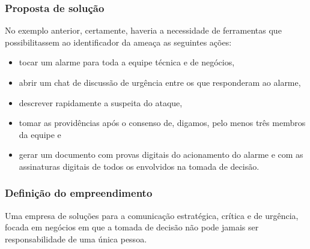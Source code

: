 \subsubsection{Proposta de solução}

No exemplo anterior, certamente, haveria a  necessidade de ferramentas que 
possibilitassem ao identificador da ameaça as seguintes ações:
\begin{itemize}
    \item tocar um alarme para toda a equipe técnica e de negócios,
    \item abrir um chat de discussão de urgência entre os que responderam 
        ao alarme, 
    \item descrever rapidamente a suspeita do ataque,
    \item tomar as providências após o consenso de, digamos, pelo menos três 
        membros da equipe e
    \item gerar um documento com provas digitais do acionamento do alarme e 
        com as assinaturas digitais de todos os envolvidos na tomada de 
        decisão.
\end{itemize}


\subsubsection{Definição do empreendimento}

Uma empresa de soluções para a comunicação estratégica, crítica e de urgência, 
focada em negócios em que a tomada de decisão não pode jamais ser 
responsabilidade de uma única pessoa.
